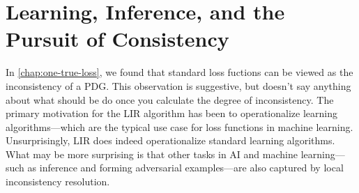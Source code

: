 

\section{Learning, Inference, and the Pursuit of Consistency}

In \cref{chap:one-true-loss}, we found that standard loss fuctions can be viewed as the inconsistency of a PDG.
This observation is suggestive, but doesn't say anything about what should be do once you calculate the degree of inconsistency. 
The primary motivation for the LIR algorithm has been to operationalize
    learning algorithms---which are the typical use case for loss functions in machine learning.
Unsurprisingly, LIR does indeed operationalize standard learning algorithms. 
What may be more surprising is that other tasks in AI and machine learning---such as inference and forming adversarial examples---are also captured by local inconsistency resolution. 

